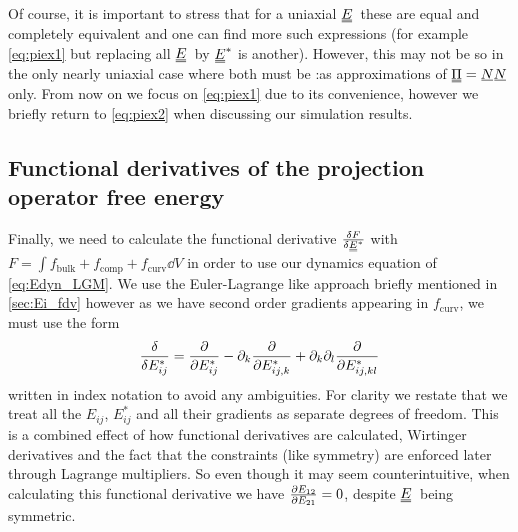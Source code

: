 \documentclass[12pt]{article}
\newcommand{\suf}[2]{\stackunder[0.5pt]{\stackunder[1pt]{\ensuremath{#1}}{\rule{\widthof{\ensuremath{#2}}*\real{0.9}}{.1ex}}}{}}
\newcommand{\duf}[2]{\stackunder[0.5pt]{\stackunder[0.8pt]{\stackunder[1pt]{\ensuremath{#1}}{\rule{\widthof{\ensuremath{#2}}*\real{0.9}}{.1ex}}}{\rule{\widthof{\ensuremath{#2}}*\real{0.9}}{.1ex}}}{}}
\newcommand{\su}[1]{\suf{#1}{#1}}
\newcommand{\du}[1]{\duf{#1}{#1}}
\newcommand{\sdu}[1]{\scriptsize\du{#1}\normalsize}
\newcommand{\pp}{\ensuremath{\partial}}
\newcommand{\NN}{\ensuremath{\su{N}}}
\newcommand{\EE}{\ensuremath{\du{E}}}
\newcommand{\PP}{\ensuremath{\du{\Pi}}}
\newcommand{\FB}{\ensuremath{f_\text{bulk}}}
\newcommand{\FC}{\ensuremath{f_\text{comp}}}
\newcommand{\FU}{\ensuremath{f_\text{curv}}}
\begin{document}
        Of course, it is important to stress that for a uniaxial \EE\ these are equal and completely equivalent and one can find more such expressions (for example \cref{eq:piex1} but replacing all \EE\ by $\EE^*$ is another).
        However, this may not be so in the only nearly uniaxial case where both must be :as approximations of $\PP=\NN\NN$ only.
        From now on we focus on \cref{eq:piex1} due to its convenience, however we briefly return to \cref{eq:piex2} when discussing our simulation results.

    \subsection{Functional derivatives of the projection operator free energy}
        Finally, we need to calculate the functional derivative $\fdv{F}{\sdu{E}^*}$ with $F=\int \FB + \FC + \FU \dd{V}$ in order to use our dynamics equation of \cref{eq:Edyn_LGM}.
        We use the Euler-Lagrange like approach briefly mentioned in \cref{sec:Ei_fdv} however as we have second order gradients appearing in \FU, we must use the form
        \begin{equation}
            \fdv{E_{ij}^*} = \pdv{E_{ij}^*} - \pp_k \pdv{E_{ij,k}^*} + \pp_k\pp_l \pdv{E_{ij,kl}^*}
        \end{equation}
        written in index notation to avoid any ambiguities.
        For clarity we restate that we treat all the $E_{ij}$, $E_{ij}^*$ and all their gradients as separate degrees of freedom.
        This is a combined effect of how functional derivatives are calculated, Wirtinger derivatives and the fact that the constraints (like symmetry) are enforced later through Lagrange multipliers.
        So even though it may seem counterintuitive, when calculating this functional derivative we have $\pdv{E_{12}}{E_{21}}=0$, despite \EE\ being symmetric.
\end{document}
